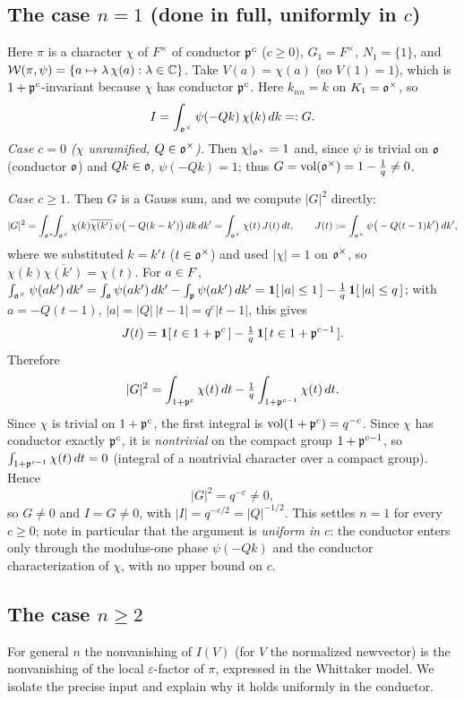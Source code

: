 \subsection*{The case $n=1$ \textup{(}done in full, uniformly in $c$\textup{)}}
Here $\pi$ is a character $\chi$ of $F^\times$ of conductor $\mathfrak{p}^{c}$ \textup{(}$c\ge0$\textup{)},
$G_1=F^\times$, $N_1=\{1\}$, and $\mathcal{W}(\pi,\psi)=\{a\mapsto \lambda\,\chi(a):\lambda\in\mathbb{C}\}$.
Take $V(a)=\chi(a)$ \textup{(}so $V(1)=1$\textup{)}, which is $1+\mathfrak{p}^{c}$-invariant because
$\chi$ has conductor $\mathfrak{p}^{c}$. Here $k_{nn}=k$ on $K_1=\mathfrak{o}^\times$, so
\[
I=\int_{\mathfrak{o}^\times}\psi(-Q k)\,\chi(k)\,dk=:G .
\]
\emph{Case $c=0$ \textup{(}$\chi$ unramified, $Q\in\mathfrak{o}^\times$\textup{)}.} Then
$\chi|_{\mathfrak{o}^\times}=1$ and, since $\psi$ is trivial on $\mathfrak{o}$ \textup{(}conductor
$\mathfrak{o}$\textup{)} and $Qk\in\mathfrak{o}$, $\psi(-Qk)=1$; thus
$G=\operatorname{vol}(\mathfrak{o}^\times)=1-\tfrac1q\neq0$.

\emph{Case $c\ge1$.} Then $G$ is a Gauss sum, and we compute $|G|^2$ directly:
\[
|G|^2=\int_{\mathfrak{o}^\times}\!\!\int_{\mathfrak{o}^\times}\chi(k)\overline{\chi(k')}\,
\psi\big(-Q(k-k')\big)\,dk\,dk'
=\int_{\mathfrak{o}^\times}\chi(t)\,J(t)\,dt,\qquad
J(t):=\int_{\mathfrak{o}^\times}\psi\big(-Q(t-1)k'\big)\,dk',
\]
where we substituted $k=k't$ \textup{(}$t\in\mathfrak{o}^\times$\textup{)} and used $|\chi|=1$ on
$\mathfrak{o}^\times$, so $\chi(k)\overline{\chi(k')}=\chi(t)$. For $a\in F$,
$\int_{\mathfrak{o}^\times}\psi(ak')\,dk'=\int_{\mathfrak{o}}\psi(ak')\,dk'-\int_{\mathfrak{p}}\psi(ak')\,dk'
=\mathbf 1[\,|a|\le1\,]-\tfrac1q\,\mathbf 1[\,|a|\le q\,]$; with $a=-Q(t-1)$, $|a|=|Q|\,|t-1|=q^{c}|t-1|$,
this gives
\[
J(t)=\mathbf 1[\,t\in1+\mathfrak{p}^{c}\,]-\tfrac1q\,\mathbf 1[\,t\in1+\mathfrak{p}^{c-1}\,].
\]
Therefore
\[
|G|^2=\int_{1+\mathfrak{p}^{c}}\chi(t)\,dt-\tfrac1q\int_{1+\mathfrak{p}^{c-1}}\chi(t)\,dt .
\]
Since $\chi$ is trivial on $1+\mathfrak{p}^{c}$, the first integral is
$\operatorname{vol}(1+\mathfrak{p}^{c})=q^{-c}$. Since $\chi$ has conductor exactly $\mathfrak{p}^{c}$, it is
\emph{nontrivial} on the compact group $1+\mathfrak{p}^{c-1}$, so $\int_{1+\mathfrak{p}^{c-1}}\chi(t)\,dt=0$
\textup{(}integral of a nontrivial character over a compact group\textup{)}. Hence
\[
|G|^2=q^{-c}\neq0,
\]
so $G\neq0$ and $I=G\neq0$, with $|I|=q^{-c/2}=|Q|^{-1/2}$. This settles $n=1$ for every $c\ge0$;
note in particular that the argument is \emph{uniform in $c$}: the conductor enters only through
the modulus-one phase $\psi(-Qk)$ and the conductor characterization of $\chi$, with no upper
bound on $c$.

\subsection*{The case $n\ge2$}
For general $n$ the nonvanishing of $I(V)$ \textup{(}for $V$ the normalized newvector\textup{)} is
the nonvanishing of the local $\varepsilon$-factor of $\pi$, expressed in the Whittaker model. We
isolate the precise input and explain why it holds uniformly in the conductor.

